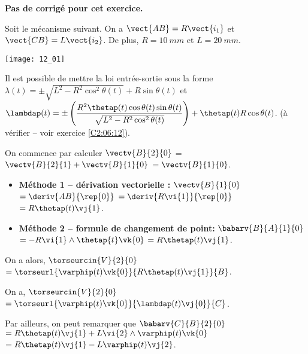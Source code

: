 \normaltrue \difficilefalse \tdifficilefalse
\correctionfalse


\setcounter{numques}{0}
\ifcorrection
\else
\textbf{Pas de corrigé pour cet exercice.}
\fi

\ifprof
\else
Soit le mécanisme suivant. On a $\vect{AB}=R\vect{i_1}$ et $\vect{CB}=L\vect{i_2}$. De plus, 
$R=\SI{10}{mm}$ et $L=\SI{20}{mm}$. 

\begin{center}
\texttt{[image: 12\_01]}
\end{center}
\fi

Il est possible de mettre la loi entrée-sortie sous la forme  
$\lambda(t) = \pm\sqrt{L^2 - R^2\cos^2\theta(t)} + R\sin\theta(t) $ 
et 
$\lambdap(t) = \pm\left( \dfrac{R^2 \thetap(t) \cos\theta(t)\sin\theta(t)}{\sqrt{L^2 - R^2\cos^2\theta(t)}}\right) + \thetap(t)R\cos\theta(t)$.
 (à vérifier -- voir exercice \ref{C2:06:12}).

\ifprof
On commence par calculer $\vectv{B}{2}{0}$ = $\vectv{B}{2}{1}+\vectv{B}{1}{0}$ $=\vectv{B}{1}{0}$.
\begin{itemize}
\item \textbf{Méthode 1 -- dérivation vectorielle :}  $\vectv{B}{1}{0}$ $=\deriv{AB}{\rep{0}}$ 
$=\deriv{R\vi{1}}{\rep{0}}$ 
$= R\thetap(t) \vj{1}$. 
\item \textbf{Méthode 2 -- formule de changement de point: }
$\babarv{B}{A}{1}{0}$ 
$= -R\vi{1}\wedge \thetap{t} \vk{0}$
$= R\thetap(t) \vj{1}$.
\end{itemize}

On a alors, 
$\torseurcin{V}{2}{0}$
$=\torseurl{\varphip(t)\vk{0}}{R\thetap(t) \vj{1}}{B}$.

\else
\fi


\ifprof
On a, 
$\torseurcin{V}{2}{0}$
$=\torseurl{\varphip(t)\vk{0}}{\lambdap(t) \vj{0}}{C}$.

Par ailleurs, on peut remarquer que 
$\babarv{C}{B}{2}{0}$
$= R\thetap(t) \vj{1} + L\vi{2}\wedge\varphip(t) \vk{0}$ 
$= R\thetap(t) \vj{1} - L\varphip(t)\vj{2}$.

